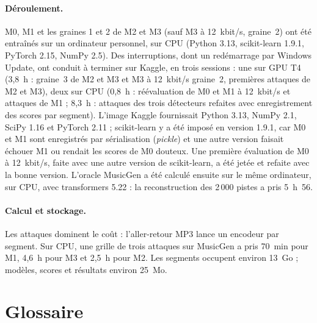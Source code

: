 \documentclass[a4paper, 11pt]{article}
\begin{document}
\paragraph{Déroulement.} M0, M1 et les graines 1 et 2 de M2 et M3 (sauf M3 à 12~kbit/s, graine~2) ont été
entraînés sur un ordinateur personnel, sur CPU (Python 3.13, scikit-learn 1.9.1, PyTorch 2.15, NumPy 2.5).
Des interruptions, dont un redémarrage par Windows Update, ont conduit à terminer sur Kaggle, en trois
sessions : une sur GPU T4 (3,8~h : graine~3 de M2 et M3 et M3 à 12~kbit/s graine~2, premières attaques de M2
et M3), deux sur CPU (0,8~h : réévaluation de M0 et M1 à 12~kbit/s et attaques de M1 ; 8,3~h : attaques des
trois détecteurs refaites avec enregistrement des scores par segment). L'image Kaggle fournissait Python 3.13,
NumPy 2.1, SciPy 1.16 et PyTorch 2.11 ; scikit-learn y a été imposé en version 1.9.1, car M0 et M1 sont
enregistrés par sérialisation (\emph{pickle}) et une autre version faisait échouer M1 ou rendait les scores de
M0 douteux. Une première évaluation de M0 à 12~kbit/s, faite avec une autre version de scikit-learn, a été
jetée et refaite avec la bonne version. L'oracle MusicGen a été calculé ensuite sur le même ordinateur, sur
CPU, avec transformers 5.22 : la reconstruction des 2\,000 pistes a pris 5~h~56.

\paragraph{Calcul et stockage.} Les attaques dominent le coût : l'aller-retour MP3 lance un encodeur par
segment. Sur CPU, une grille de trois attaques sur MusicGen a pris 70~min pour M1, 4,6~h pour M3 et 2,5~h
pour M2. Les segments occupent environ 13~Go ; modèles, scores et résultats environ 25~Mo.

\section{Glossaire}
\end{document}
